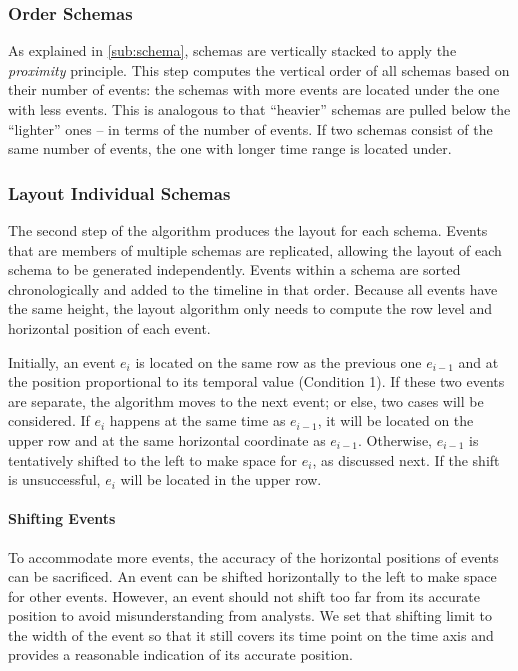 \subsubsection{Order Schemas}
As explained in \autoref{sub:schema}, schemas are vertically stacked to apply the \emph{proximity} principle. This step computes the vertical order of all schemas based on their number of events: the schemas with more events are located under the one with less events. This is analogous to that ``heavier'' schemas are pulled below the ``lighter'' ones -- in terms of the number of events. If two schemas consist of the same number of events, the one with longer time range is located under.

\subsubsection{Layout Individual Schemas}
\label{sub:layout-schema}
The second step of the algorithm produces the layout for each schema. Events that are members of multiple schemas are replicated, allowing the layout of each schema to be generated independently. Events within a schema are sorted chronologically and added to the timeline in that order. Because all events have the same height, the layout algorithm only needs to compute the row level and horizontal position of each event. 

Initially, an event $e_i$ is located on the same row as the previous one $e_{i-1}$ and at the position proportional to its temporal value (Condition 1). If these two events are separate, the algorithm moves to the next event; or else, two cases will be considered. If $e_i$ happens at the same time as $e_{i-1}$, it will be located on the upper row and at the same horizontal coordinate as $e_{i-1}$. Otherwise, $e_{i-1}$ is tentatively shifted to the left to make space for $e_i$, as discussed next. If the shift is unsuccessful, $e_i$ will be located in the upper row.

\paragraph*{Shifting Events}
To accommodate more events, the accuracy of the horizontal positions of events can be sacrificed. An event can be shifted horizontally to the left to make space for other events. However, an event should not shift too far from its accurate position to avoid misunderstanding from analysts. We set that shifting limit to the width of the event so that it still covers its time point on the time axis and provides a reasonable indication of its accurate position. 

